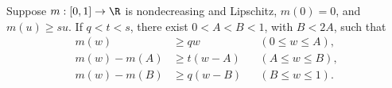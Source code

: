 \begin{lemma}\label{prep:contact}
Suppose $m:[0,1]\to\R$ is nondecreasing and Lipschitz,
$m(0)=0$, and $m(u)\ge su$. If $q<t<s$, there exist
$0<A<B<1$, with $B<2A$, such that
\begin{align}
 m(w)&\ge qw &&(0\le w\le A),\label{prep:contact-first}\\
 m(w)-m(A)&\ge t(w-A)&&(A\le w\le B),\label{prep:contact-middle}\\
 m(w)-m(B)&\ge q(w-B)&&(B\le w\le1).\label{prep:contact-last}
\end{align}
\end{lemma}
